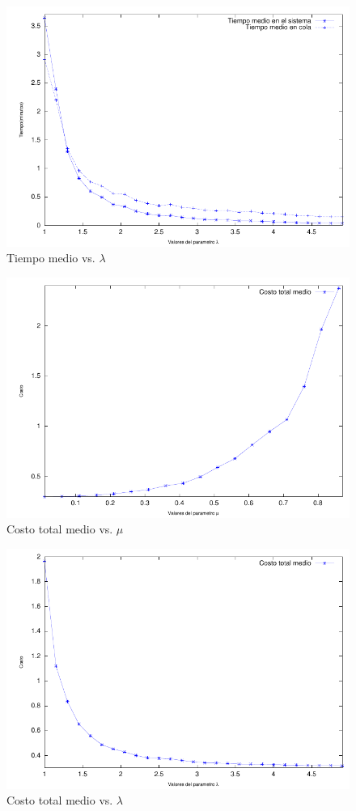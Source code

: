 \documentclass{sig-alternate}
\begin{document}
\begin{figure}[hp]
\centering
\includegraphics[scale=0.8]{graficos/tMedio}
\caption{Tiempo medio vs. $\lambda$}
\label{fig:tmediolambda}
\end{figure}

\begin{figure}[hp]
\centering
\includegraphics[scale=0.8]{graficos/CTMediomu}
\caption{Costo total medio vs. $\mu$}
\label{fig:ctmm}
\end{figure}

\begin{figure}[hp]
\centering
\includegraphics[scale=0.8]{graficos/CTMediolambda}
\caption{Costo total medio vs. $\lambda$}
\label{fig:ctml}
\end{figure}
\end{document}
